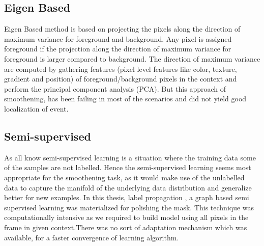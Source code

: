 \subsection{Eigen Based}
Eigen Based method is based on projecting the pixels along the direction of maximum variance for foreground and background. Any pixel is assigned foreground if the projection along the direction of maximum variance for foreground is larger compared to  background. The direction of maximum variance are computed by gathering features (pixel level features like color, texture, gradient and position) of foreground/background pixels in the context and perform the principal component analysis (PCA). But this approach of smoothening, has been failing in most of the scenarios and did not yield good localization of event.
\subsection{Semi-supervised}
As all know semi-supervised learning is a situation where the training data some of the samples are not labelled. Hence the semi-supervised learning seems most appropriate for the smoothening task, as it would make use of the unlabelled data to capture the manifold of the underlying data distribution and generalize better for new examples. In this thesis, label propagation \citep{labprop}, a graph based semi supervised learning was materialized for polishing the mask. This technique was computationally intensive as we required to build model using all pixels in the frame in given context.There was no sort of adaptation mechanism which was available, for a faster convergence of learning algorithm.
